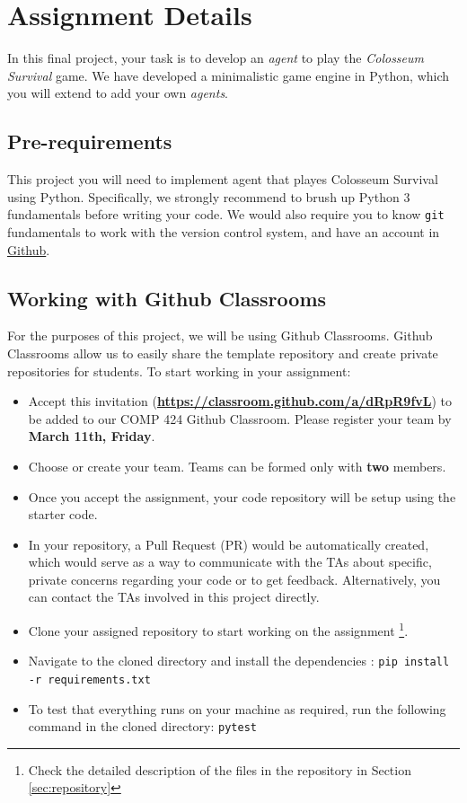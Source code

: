 \documentclass[twoside,11pt]{article}
\begin{document}
\section{Assignment Details}

In this final project, your task is to develop an \textit{agent} to play the \textit{Colosseum Survival} game. We have developed a minimalistic game engine in Python, which you will extend to add your own \textit{agents}. 

\subsection{Pre-requirements}

This project you will need to implement agent that playes Colosseum Survival using Python. Specifically, we strongly recommend to brush up Python 3 fundamentals before writing your code. We would also require you to know \texttt{git} fundamentals to work with the version control system, and have an account in \href{https://github.com}{Github}.

\subsection{Working with Github Classrooms}

For the purposes of this project, we will be using Github Classrooms. Github Classrooms allow us to easily share the template repository and create private repositories for students. To start working in your assignment:

\begin{itemize}
    \item Accept this invitation (\textbf{\href{https://classroom.github.com/a/dRpR9fvL}{https://classroom.github.com/a/dRpR9fvL}}) to be added to our COMP 424 Github Classroom. Please register your team by \textbf{March 11th, Friday}.
    \item Choose or create your team. Teams can be formed only with \textbf{two} members.
    \item Once you accept the assignment, your code repository will be setup using the starter code. 
    \item In your repository, a Pull Request (PR) would be automatically created, which would serve as a way to communicate with the TAs about specific, private concerns regarding your code or to get feedback. Alternatively, you can contact the TAs involved in this project directly.
    \item Clone your assigned repository to start working on the assignment \footnote{Check the detailed description of the files in the repository in Section \ref{sec:repository}}.
    \item Navigate to the cloned directory and install the dependencies : \texttt{pip install -r requirements.txt}
    \item To test that everything runs on your machine as required, run the following command in the cloned directory: \texttt{pytest}
\end{itemize}
\end{document}
